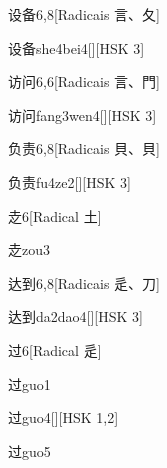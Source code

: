 \begin{entry}{设备}{6,8}[Radicais ⾔、⼡]
  \begin{phonetics}{设备}{she4bei4}[][HSK 3]
  \end{phonetics}
\end{entry}

\begin{entry}{访问}{6,6}[Radicais ⾔、⾨]
  \begin{phonetics}{访问}{fang3wen4}[][HSK 3]
  \end{phonetics}
\end{entry}

\begin{entry}{负责}{6,8}[Radicais ⾙、⾙]
  \begin{phonetics}{负责}{fu4ze2}[][HSK 3]
  \end{phonetics}
\end{entry}

\begin{entry}{赱}{6}[Radical ⼟]
  \begin{phonetics}{赱}{zou3}
  \end{phonetics}
\end{entry}

\begin{entry}{达到}{6,8}[Radicais ⾡、⼑]
  \begin{phonetics}{达到}{da2dao4}[][HSK 3]
  \end{phonetics}
\end{entry}

\begin{entry}{过}{6}[Radical ⾡]
  \begin{phonetics}{过}{guo1}
  \end{phonetics}
  \begin{phonetics}{过}{guo4}[][HSK 1,2]
  \end{phonetics}
  \begin{phonetics}{过}{guo5}
  \end{phonetics}
\end{entry}

